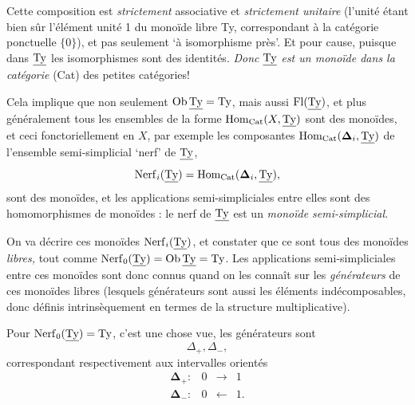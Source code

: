 Cette composition est \textit{strictement} associative et \textit{strictement unitaire} (l'unité étant bien sûr l'élément unité 1 du monoïde libre Ty, correspondant à la catégorie ponctuelle $\{0\}$), et pas seulement `à isomorphisme près'. Et pour cause, puisque dans $\underline{\mathrm{Ty}}$ les isomorphismes sont des identités. \textit{Donc} $\underline{\mathrm{Ty}}$ \textit{est un monoïde dans la catégorie} (Cat) des petites catégories!

Cela implique que non seulement $\mathrm{Ob}\,\underline{\mathrm{Ty}} = \mathrm{Ty}$, mais aussi $\mathrm{Fl}(\underline{\mathrm{Ty}})$, et plus généralement tous les ensembles de la forme $\mathrm{Hom}_{\mathrm{Cat}}(X, \underline{\mathrm{Ty}})$ sont des monoïdes, et ceci fonctoriellement en $X$, par exemple les composantes $\mathrm{Hom}_{\mathrm{Cat}}(\boldsymbol{\Delta}_i, \underline{\mathrm{Ty}})$ de l'ensemble semi-simplicial `nerf' de $\underline{\mathrm{Ty}}$,
\[
\mathrm{Nerf}_i(\underline{\mathrm{Ty}}) = \mathrm{Hom}_{\mathrm{Cat}}(\boldsymbol{\Delta}_i, \underline{\mathrm{Ty}}),
\]
sont des monoïdes, et les applications semi-simpliciales entre elles sont des homomorphismes de monoïdes : le nerf de $\underline{\mathrm{Ty}}$ est un \textit{monoïde semi-simplicial.}

On va décrire ces monoïdes $\mathrm{Nerf}_i(\underline{\mathrm{Ty}})$, et constater que ce sont tous des monoïdes \textit{libres,} tout comme $\mathrm{Nerf}_0(\underline{\mathrm{Ty}}) = \mathrm{Ob}\,\underline{\mathrm{Ty}} = \mathrm{Ty}$. Les applications semi-simpliciales entre ces monoïdes sont donc connus quand on les connaît sur les \textit{générateurs} de ces monoïdes libres (lesquels générateurs sont aussi les éléments indécomposables, donc définis intrinsèquement en termes de la structure multiplicative). %

Pour $\mathrm{Nerf}_0(\underline{\mathrm{Ty}}) = \mathrm{Ty}$, c'est une chose vue, les générateurs sont
\[
\Delta_+,\Delta_-,
\]
correspondant respectivement aux intervalles orientés
\[
\begin{array}{rccc}
\boldsymbol{\Delta}_+ : & 0 & \longrightarrow & 1\\[4pt]
\boldsymbol{\Delta}_- : & 0 & \longleftarrow & 1.
\end{array}
\]

